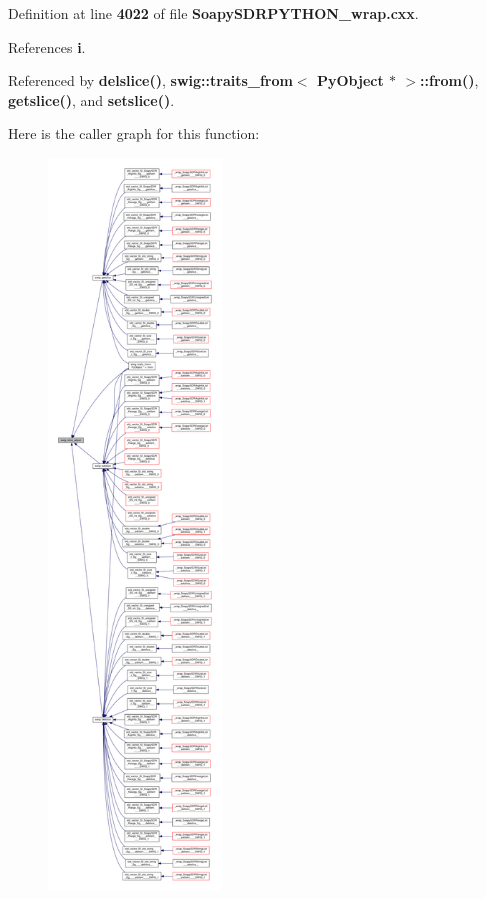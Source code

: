 Definition at line {\bf 4022} of file {\bf Soapy\+S\+D\+R\+P\+Y\+T\+H\+O\+N\+\_\+wrap.\+cxx}.



References {\bf i}.



Referenced by {\bf delslice()}, {\bf swig\+::traits\+\_\+from$<$ Py\+Object $\ast$ $>$\+::from()}, {\bf getslice()}, and {\bf setslice()}.



Here is the caller graph for this function\+:
\nopagebreak
\begin{figure}[H]
\begin{center}
\leavevmode
\includegraphics[height=550pt]{d3/d99/namespaceswig_aa9b510369aeb29e93ad75379c3ea447d_icgraph}
\end{center}
\end{figure}


